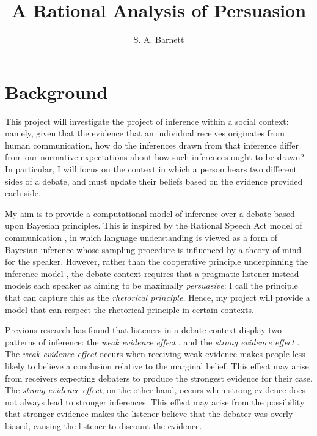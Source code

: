 \documentclass{article}
\title{A Rational Analysis of Persuasion}
\author{S. A. Barnett}
\date{}
\begin{document}
\maketitle

\section{Background}

This project will investigate the project of inference within a social context: namely, given that the evidence that an individual receives originates from human communication, how do the inferences drawn from that inference differ from our normative expectations about how such inferences ought to be drawn? In particular, I will focus on the context in which a person hears two different sides of a debate, and must update their beliefs based on the evidence provided each side. 

My aim is to provide a computational model of inference over a debate based upon Bayesian principles. This is inspired by the Rational Speech Act model of communication \cite{goodman_pragmatic_2016}, in which language understanding is viewed as a form of Bayesian inference whose sampling procedure is influenced by a theory of mind for the speaker. However, rather than the cooperative principle underpinning the inference model \cite{grice_logic_1975}, the debate context requires that a pragmatic listener instead models each speaker as aiming to be maximally \textit{persuasive}: I call the principle that can capture this as the \textit{rhetorical principle.} Hence, my project will provide a model that can respect the rhetorical principle in certain contexts.

Previous research has found that listeners in a debate context display two patterns of inference: the \textit{weak evidence effect} \cite{mckenzie_when_2002, fernbach_when_2011, harris_james_2013}, and the \textit{strong evidence effect} \cite{perfors_stronger_2018}. The \textit{weak evidence effect} occurs when receiving weak evidence makes people less likely to believe a conclusion relative to the marginal belief. This effect may arise from receivers expecting debaters to produce the strongest evidence for their case. The \textit{strong evidence effect}, on the other hand, occurs when strong evidence does not always lead to stronger inferences. This effect may arise from the possibility that stronger evidence makes the listener believe that the debater was overly biased, causing the listener to discount the evidence.
\end{document}
